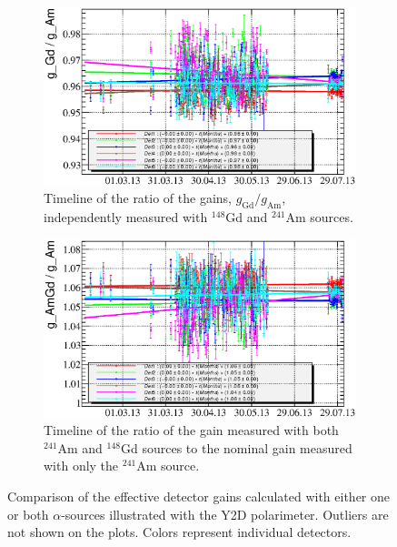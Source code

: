 \documentclass[a4paper,12pt]{article}
\newcommand\americium{${}^{241}$Am}
\newcommand\gadolinium{${}^{148}$Gd}
\begin{document}
\newcommand\gainrealationslabel{Comparison of the effective detector gains
calculated with either one or both $\alpha$-sources illustrated with the Y2D
polarimeter. Outliers are not shown on the plots. Colors represent individual
detectors.}
\begin{figure}[p]
%
\begin{subfigure}[t]{0.49\textwidth}
\includegraphics[width=\textwidth]{gfx/run13_alpha_study/Y2U/c_chGdGain_over_AmGain_by_day_Y2U.eps}
\caption{Timeline of the ratio of the gains, $g_\text{Gd}/g_\text{Am}$,
independently measured with \gadolinium{} and \americium{} sources.}
\end{subfigure}
%
\hfill
%
\begin{subfigure}[t]{0.49\textwidth}
\includegraphics[width=\textwidth]{gfx/run13_alpha_study/Y2U/c_chAmGdGain_over_AmGain_by_day_Y2U.eps}
\caption{Timeline of the ratio of the gain measured with both \americium{} and
\gadolinium{} sources to the nominal gain measured with only the \americium{}
source.}
\end{subfigure}
%
\caption{\gainrealationslabel}
\label{fig:gain_relations}
\end{figure}
\end{document}
